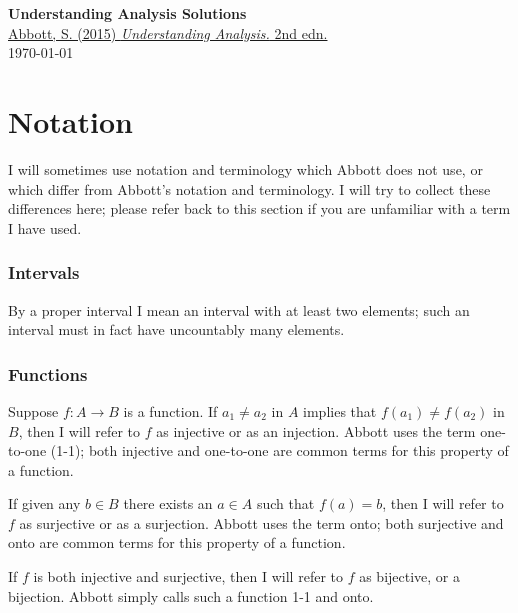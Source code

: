 \documentclass{lew98_solutions}
\begin{document}
\begin{titlepage}
    \begin{center}
        {\bfseries \huge Understanding Analysis Solutions} \\[2mm]
        \href{https://link.springer.com/book/10.1007/978-1-4939-2712-8}{Abbott, S. (2015) \textit{Understanding Analysis.} 2nd edn.} \\[4mm]
        \today
    \end{center}

    {\let\clearpage\relax \tableofcontents}
    \thispagestyle{empty}
\end{titlepage}

\hypertarget{notation}{}

\section*{Notation}

I will sometimes use notation and terminology which Abbott does not use, or which differ from Abbott's notation and terminology. I will try to collect these differences here; please refer back to this section if you are unfamiliar with a term I have used.

\subsubsection*{Intervals}
By a proper interval I mean an interval with at least two elements; such an interval must in fact have uncountably many elements.

\subsubsection*{Functions}

Suppose \( f : A \to B \) is a function. If \( a_1 \neq a_2 \) in \( A \) implies that \( f(a_1) \neq f(a_2) \) in \( B \), then I will refer to \( f \) as injective or as an injection. Abbott uses the term one-to-one (1-1); both injective and one-to-one are common terms for this property of a function. 

If given any \( b \in B \) there exists an \( a \in A \) such that \( f(a) = b \), then I will refer to \( f \) as surjective or as a surjection. Abbott uses the term onto; both surjective and onto are common terms for this property of a function.

If \( f \) is both injective and surjective, then I will refer to \( f \) as bijective, or a bijection. Abbott simply calls such a function 1-1 and onto.
\end{document}
